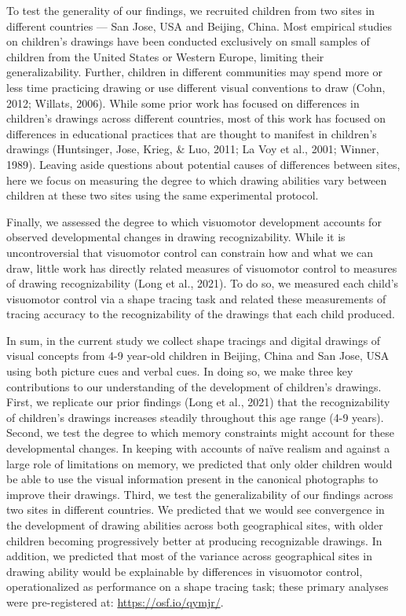 \documentclass[
  man]{apa6}
\begin{document}
To test the generality of our findings, we recruited children from two sites in different countries --- San Jose, USA and Beijing, China.
Most empirical studies on children's drawings have been conducted exclusively on small samples of children from the United States or Western Europe, limiting their generalizability. Further, children in different communities may spend more or less time practicing drawing or use different visual conventions to draw (Cohn, 2012; Willats, 2006). While some prior work has focused on differences in children's drawings across different countries, most of this work has focused on differences in educational practices that are thought to manifest in children's drawings (Huntsinger, Jose, Krieg, \& Luo, 2011; La Voy et al., 2001; Winner, 1989). Leaving aside questions about potential causes of differences between sites, here we focus on measuring the degree to which drawing abilities vary between children at these two sites using the same experimental protocol.

Finally, we assessed the degree to which visuomotor development accounts for observed developmental changes in drawing recognizability. While it is uncontroversial that visuomotor control can constrain how and what we can draw, little work has directly related measures of visuomotor control to measures of drawing recognizability (Long et al., 2021). To do so, we measured each child's visuomotor control via a shape tracing task and related these measurements of tracing accuracy to the recognizability of the drawings that each child produced.

In sum, in the current study we collect shape tracings and digital drawings of visual concepts from 4-9 year-old children in Beijing, China and San Jose, USA using both picture cues and verbal cues. In doing so, we make three key contributions to our understanding of the development of children's drawings. First, we replicate our prior findings (Long et al., 2021) that the recognizability of children's drawings increases steadily throughout this age range (4-9 years). Second, we test the degree to which memory constraints might account for these developmental changes. In keeping with accounts of naïve realism and against a large role of limitations on memory, we predicted that only older children would be able to use the visual information present in the canonical photographs to improve their drawings. Third, we test the generalizability of our findings across two sites in different countries. We predicted that we would see convergence in the development of drawing abilities across both geographical sites, with older children becoming progressively better at producing recognizable drawings. In addition, we predicted that most of the variance across geographical sites in drawing ability would be explainable by differences in visuomotor control, operationalized as performance on a shape tracing task; these primary analyses were pre-registered at: \url{https://osf.io/qymjr/}.
\end{document}
